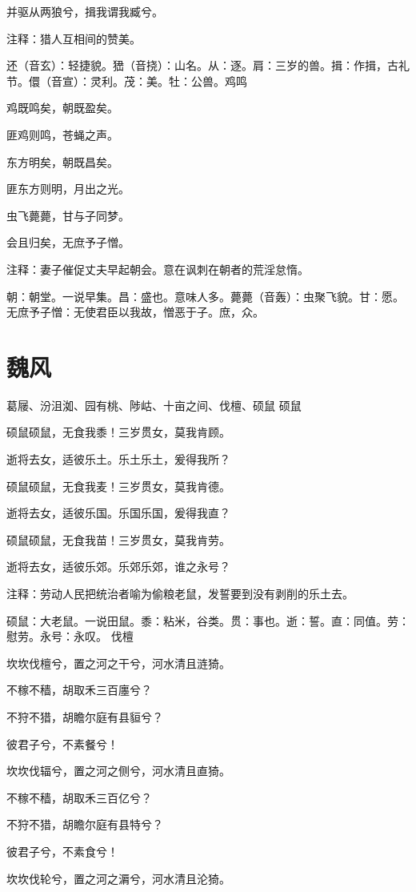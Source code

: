 \documentclass[12pt,UTF8]{ctexbook}
\begin{document}
并驱从两狼兮，揖我谓我臧兮。

注释：猎人互相间的赞美。

还（音玄）：轻捷貌。峱（音挠）：山名。从：逐。肩：三岁的兽。揖：作揖，古礼节。儇（音宣）：灵利。茂：美。牡：公兽。鸡鸣

鸡既鸣矣，朝既盈矣。

匪鸡则鸣，苍蝇之声。

东方明矣，朝既昌矣。

匪东方则明，月出之光。

虫飞薨薨，甘与子同梦。

会且归矣，无庶予子憎。

注释：妻子催促丈夫早起朝会。意在讽刺在朝者的荒淫怠惰。

朝：朝堂。一说早集。昌：盛也。意味人多。薨薨（音轰）：虫聚飞貌。甘：愿。无庶予子憎：无使君臣以我故，憎恶于子。庶，众。



\part{魏风}
葛屦、汾沮洳、园有桃、陟岵、十亩之间、伐檀、硕鼠
硕鼠

硕鼠硕鼠，无食我黍！三岁贯女，莫我肯顾。

逝将去女，适彼乐土。乐土乐土，爰得我所？

硕鼠硕鼠，无食我麦！三岁贯女，莫我肯德。

逝将去女，适彼乐国。乐国乐国，爰得我直？

硕鼠硕鼠，无食我苗！三岁贯女，莫我肯劳。

逝将去女，适彼乐郊。乐郊乐郊，谁之永号？

注释：劳动人民把统治者喻为偷粮老鼠，发誓要到没有剥削的乐土去。

硕鼠：大老鼠。一说田鼠。黍：粘米，谷类。贯：事也。逝：誓。直：同值。劳：慰劳。永号：永叹。 伐檀

坎坎伐檀兮，置之河之干兮，河水清且涟猗。

不稼不穑，胡取禾三百廛兮？

不狩不猎，胡瞻尔庭有县貆兮？

彼君子兮，不素餐兮！

坎坎伐辐兮，置之河之侧兮，河水清且直猗。

不稼不穑，胡取禾三百亿兮？

不狩不猎，胡瞻尔庭有县特兮？

彼君子兮，不素食兮！

坎坎伐轮兮，置之河之漘兮，河水清且沦猗。
\end{document}
